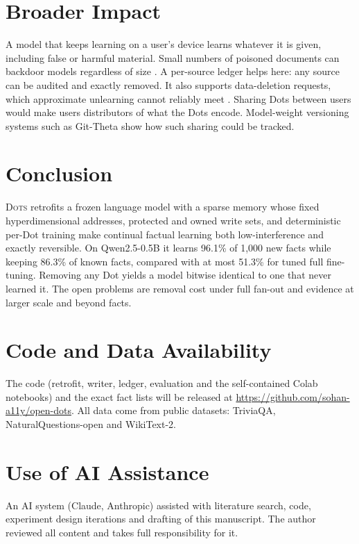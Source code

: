 \documentclass[journal]{IEEEtran}
\newcommand{\sys}{\textsc{Dots}}
\let\citep\cite \let\citet\cite
\begin{document}
\section{Broader Impact}

A model that keeps learning on a user's device learns whatever it is given, including false or harmful material. Small numbers of poisoned documents can backdoor models regardless of size \citep{souly2025poisoning}. A per-source ledger helps here: any source can be audited and exactly removed. It also supports data-deletion requests, which approximate unlearning cannot reliably meet \citep{zhang2025quant}. Sharing Dots between users would make users distributors of what the Dots encode. Model-weight versioning systems such as Git-Theta \citep{kandpal2023gittheta} show how such sharing could be tracked.

\section{Conclusion}

\sys{} retrofits a frozen language model with a sparse memory whose fixed hyperdimensional addresses, protected and owned write sets, and deterministic per-Dot training make continual factual learning both low-interference and exactly reversible. On Qwen2.5-0.5B it learns 96.1\% of 1{,}000 new facts while keeping 86.3\% of known facts, compared with at most 51.3\% for tuned full fine-tuning. Removing any Dot yields a model bitwise identical to one that never learned it. The open problems are removal cost under full fan-out and evidence at larger scale and beyond facts.

\section*{Code and Data Availability}
The code (retrofit, writer, ledger, evaluation and the self-contained Colab notebooks) and the exact fact lists will be released at \url{https://github.com/sohan-a11y/open-dots}. All data come from public datasets: TriviaQA, NaturalQuestions-open and WikiText-2.

\section*{Use of AI Assistance}
An AI system (Claude, Anthropic) assisted with literature search, code, experiment design iterations and drafting of this manuscript. The author reviewed all content and takes full responsibility for it.
\end{document}
